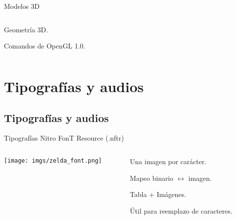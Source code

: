 \begin{frame}{Modelos 3D}
    \begin{columns}
    \begin{column}{0.5\textwidth}
        \begin{wideitemize}
            \item<1-> Geometría 3D.
            \item<2-> Comandos de OpenGL 1.0.
        \end{wideitemize}
    \end{column}
    \begin{column}{0.6\textwidth}
    \end{column}
    \end{columns}
\end{frame}

\section{Tipografías y audios}
\subsection{Tipografías y audios}
\begin{frame}{Tipografías}
    \centering{}Nitro FonT Resource (.nftr) \\ \vspace{5pt}
    \begin{columns}
    \begin{column}{0.5\textwidth}
        \texttt{[image: imgs/zelda\_font.png]}
    \end{column}
    \begin{column}{0.6\textwidth}
        \begin{wideitemize}
            \item<+-> Una imagen por carácter.
            \item<+-> Mapeo binario $\leftrightarrow$ imagen.
            \item<+-> Tabla + Imágenes.
            \item<+-> Útil para reemplazo de caracteres.
        \end{wideitemize}
    \end{column}
    \end{columns}
\end{frame}

